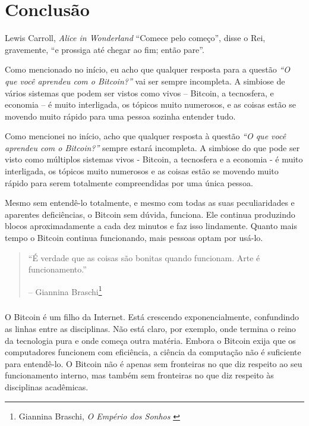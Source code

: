 
\label{ch:conclusion}

\chapter*{Conclusão}

\begin{chapquote}{Lewis Carroll, \textit{Alice in Wonderland}}
\enquote{Comece pelo começo}, disse o Rei, gravemente, \enquote{e prossiga até chegar ao fim; então pare}.

\end{chapquote}
Como mencionado no início, eu acho que qualquer resposta para a questão 
\textit{“O que você aprendeu com o Bitcoin?”} vai ser sempre incompleta. 
A simbiose de vários sistemas que podem ser vistos como vivos -- Bitcoin, 
a tecnosfera, e economia -- é muito interligada, os tópicos muito numerosos, e 
as coisas estão se movendo muito rápido para uma pessoa sozinha entender tudo.

Como mencionei no início, acho que qualquer resposta à questão \textit{“O que você aprendeu com o Bitcoin?”} sempre estará incompleta. A simbiose do que pode ser visto como múltiplos sistemas vivos - Bitcoin, a tecnosfera e a economia - é muito interligada, os tópicos muito numerosos e as coisas estão se movendo muito rápido para serem totalmente compreendidas por uma única pessoa.

Mesmo sem entendê-lo totalmente, e mesmo com todas as suas peculiaridades e aparentes deficiências, o Bitcoin sem dúvida, funciona. Ele continua produzindo blocos aproximadamente a cada dez minutos e faz isso lindamente. Quanto mais tempo o Bitcoin continua funcionando, mais pessoas optam por usá-lo.

\begin{quotation}\begin{samepage}
\enquote{É verdade que as coisas são bonitas quando funcionam. Arte é funcionamento.}
\begin{flushright} -- Giannina Braschi\footnote{Giannina Braschi, \textit{O Empério dos Sonhos} \cite{braschi2011empire}}
\end{flushright}\end{samepage}\end{quotation}

\paragraph{}
O Bitcoin é um filho da Internet. Está crescendo exponencialmente, confundindo as linhas entre as disciplinas. Não está claro, por exemplo, onde termina o reino da tecnologia pura e onde começa outra matéria. Embora o Bitcoin exija que os computadores funcionem com eficiência, a ciência da computação não é suficiente para entendê-lo. O Bitcoin não é apenas sem fronteiras no que diz respeito ao seu funcionamento interno, mas também sem fronteiras no que diz respeito às disciplinas acadêmicas.

